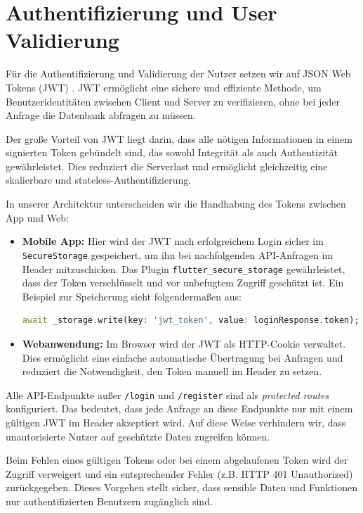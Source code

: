 \documentclass[11pt,a4paper]{article}
\begin{document}
\section{Authentifizierung und User Validierung}

Für die Authentifizierung und Validierung der Nutzer setzen wir auf JSON Web Tokens (JWT) \cite{jwt}. JWT ermöglicht eine sichere und effiziente Methode, um Benutzeridentitäten zwischen Client und Server zu verifizieren, ohne bei jeder Anfrage die Datenbank abfragen zu müssen.

Der große Vorteil von JWT liegt darin, dass alle nötigen Informationen in einem signierten Token gebündelt sind, das sowohl Integrität als auch Authentizität gewährleistet. Dies reduziert die Serverlast und ermöglicht gleichzeitig eine skalierbare und stateless-Authentifizierung.

In unserer Architektur unterscheiden wir die Handhabung des Tokens zwischen App und Web:

\begin{itemize}
    \item \textbf{Mobile App:} Hier wird der JWT nach erfolgreichem Login sicher im \texttt{SecureStorage} gespeichert, um ihn bei nachfolgenden API-Anfragen im Header mitzuschicken. Das Plugin \texttt{flutter\_secure\_storage}\cite{flutter_secure_storage} gewährleistet, dass der Token verschlüsselt und vor unbefugtem Zugriff geschützt ist. Ein Beispiel zur Speicherung sieht folgendermaßen aus:

\begin{lstlisting}[language=Dart, caption=Speichern des JWT im Secure Storage]
await _storage.write(key: 'jwt_token', value: loginResponse.token);
\end{lstlisting}

    \item \textbf{Webanwendung:} Im Browser wird der JWT als HTTP-Cookie verwaltet. Dies ermöglicht eine einfache automatische Übertragung bei Anfragen und reduziert die Notwendigkeit, den Token manuell im Header zu setzen.
\end{itemize}

Alle API-Endpunkte außer \texttt{/login} und \texttt{/register} sind als \textit{protected routes} konfiguriert. Das bedeutet, dass jede Anfrage an diese Endpunkte nur mit einem gültigen JWT im Header akzeptiert wird. Auf diese Weise verhindern wir, dass unautorisierte Nutzer auf geschützte Daten zugreifen können.

Beim Fehlen eines gültigen Tokens oder bei einem abgelaufenen Token wird der Zugriff verweigert und ein entsprechender Fehler (z.B. HTTP 401 Unauthorized) zurückgegeben. Dieses Vorgehen stellt sicher, dass sensible Daten und Funktionen nur authentifizierten Benutzern zugänglich sind.
\end{document}
